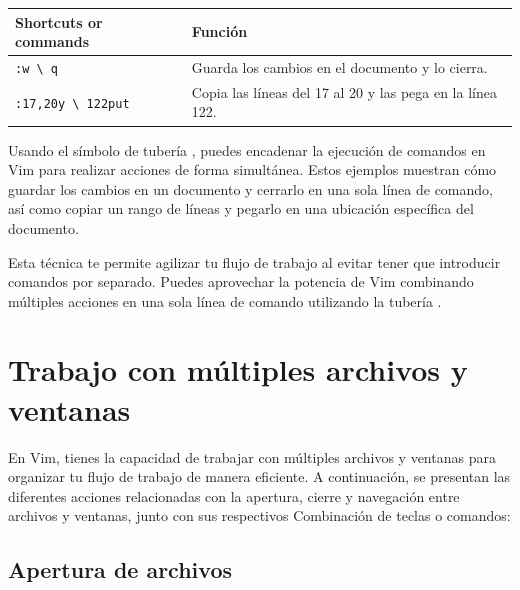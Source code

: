 \documentclass[
  doc,
  floatsintext,
  longtable,
  a4paper,
  nolmodern,
  notxfonts,
  notimes,
  12pt,
  colorlinks=true,linkcolor=blue,citecolor=blue,urlcolor=blue]{apa7}
\newcounter{none} %
\begin{document}
{\def\LTcaptype{none} %
\begin{longtable}[]{@{}
  >{\raggedright\arraybackslash}p{}
  >{\raggedright\arraybackslash}p{}@{}}
\toprule\noalign{}
\begin{minipage}[b]{\linewidth}\raggedright
Shortcuts or commands
\end{minipage} & \begin{minipage}[b]{\linewidth}\raggedright
Función
\end{minipage} \\
\midrule\noalign{}
\endhead
\bottomrule\noalign{}
\endlastfoot
\texttt{:w\ \textbackslash{}\textbar{}\ q} & Guarda los cambios en el
documento y lo cierra. \\
\texttt{:17,20y\ \textbackslash{}\textbar{}\ 122put} & Copia las líneas
del 17 al 20 y las pega en la línea 122. \\
\end{longtable}
}

Usando el símbolo de tubería \texttt{\textbar{}}, puedes encadenar la
ejecución de comandos en Vim para realizar acciones de forma simultánea.
Estos ejemplos muestran cómo guardar los cambios en un documento y
cerrarlo en una sola línea de comando, así como copiar un rango de
líneas y pegarlo en una ubicación específica del documento.

Esta técnica te permite agilizar tu flujo de trabajo al evitar tener que
introducir comandos por separado. Puedes aprovechar la potencia de Vim
combinando múltiples acciones en una sola línea de comando utilizando la
tubería \texttt{\textbar{}}.

\section{Trabajo con múltiples archivos y
ventanas}\label{trabajo-con-muxfaltiples-archivos-y-ventanas}

En Vim, tienes la capacidad de trabajar con múltiples archivos y
ventanas para organizar tu flujo de trabajo de manera eficiente. A
continuación, se presentan las diferentes acciones relacionadas con la
apertura, cierre y navegación entre archivos y ventanas, junto con sus
respectivos Combinación de teclas o comandos:

\subsection{Apertura de archivos}\label{apertura-de-archivos}
\end{document}
